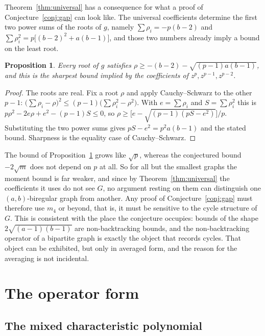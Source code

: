 \documentclass[11pt]{article}
\newtheorem{proposition}[theorem]{Proposition}
\theoremstyle{remark}
\begin{document}
Theorem~\ref{thm:universal} has a consequence for what a proof of
Conjecture~\ref{conj:gap} can look like. The universal coefficients determine the
first two power sums of the roots of $g$, namely
$\sum\rho_i=-p(b-2)$ and $\sum\rho_i^2=p\bigl[(b-2)^2+a(b-1)\bigr]$, and those
two numbers already imply a bound on the least root.

\begin{proposition}\label{prop:moments}
Every root of $g$ satisfies
$\rho\ge-(b-2)-\sqrt{(p-1)a(b-1)}$, and this is the sharpest bound implied by
the coefficients of $z^p,z^{p-1},z^{p-2}$.
\end{proposition}

\begin{proof}
The roots are real. Fix a root $\rho$ and apply Cauchy--Schwarz to the other
$p-1$: $\bigl(\sum\rho_i-\rho\bigr)^2\le(p-1)\bigl(\sum\rho_i^2-\rho^2\bigr)$.
With $e=\sum\rho_i$ and $S=\sum\rho_i^2$ this is
$p\rho^2-2e\rho+e^2-(p-1)S\le0$, so
$\rho\ge\bigl[e-\sqrt{(p-1)(pS-e^2)}\bigr]/p$. Substituting the two power sums
gives $pS-e^2=p^2a(b-1)$ and the stated bound. Sharpness is the equality case of
Cauchy--Schwarz.
\end{proof}

The bound of Proposition~\ref{prop:moments} grows like $\sqrt p$, whereas the
conjectured bound $-2\sqrt m$ does not depend on $p$ at all. So for all but the
smallest graphs the moment bound is far weaker, and since by
Theorem~\ref{thm:universal} the coefficients it uses do not see $G$, no argument
resting on them can distinguish one $(a,b)$-biregular graph from another. Any
proof of Conjecture~\ref{conj:gap} must therefore use $m_4$ or beyond, that is,
it must be sensitive to the cycle structure of $G$. This is consistent with the
place the conjecture occupies: bounds of the shape $2\sqrt{(a-1)(b-1)}$ are
non-backtracking bounds, and the non-backtracking operator of a bipartite graph
is exactly the object that records cycles. That object can be exhibited, but only
in averaged form, and the reason for the averaging is not incidental.

\section{The operator form}

\subsection{The mixed characteristic polynomial}
\end{document}
